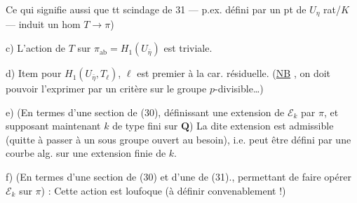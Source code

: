 Ce qui signifie aussi que tt  scindage
de 31 --- p.ex. défini par un pt de $U_\eta$
rat/$K$ --- induit un hom $T\longrightarrow\pi$)

\noindent c) L'action de $T$ sur $\pi_{\mathrm{ab}}=H_1(U_{\bar\eta})$ est
triviale.

\noindent d) Item pour $H_1(U_{\bar\eta},T_\ell)$,  $\ell$ est premier
à la car. résiduelle. (\uline{NB}  ,
on doit pouvoir l'exprimer par un critère
sur le groupe $p$-divisible\ldots)

\noindent e) (En termes d'une section de (30),
définissant une extension de $\mathcal E_k$ par $\pi$,
et supposant maintenant $k$ de type
fini sur $\mathbf Q$) La dite extension est
admissible (quitte à passer à un
sous groupe ouvert  au besoin), i.e.
peut être défini par une courbe alg.
sur  une extension finie de $k$.

\noindent f) (En termes d'une section de (30)
et d'une de (31)., permettant de
faire opérer $\mathcal E_k$ sur $\pi$) : Cette
action est  loufoque (à définir convenablement !)%
